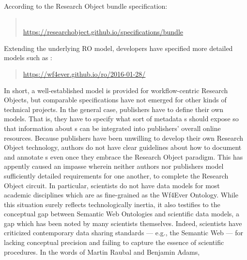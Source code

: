 \documentclass[10pt,letterpaper]{article}
\newcommand{\rpdfLink}[1]{\href{#1}{\small{#1}}}
\begin{document}
According to the Research Object bundle specification: 

\begin{quote}{}\\
\rpdfLink{https://researchobject.github.io/specifications/bundle}
\end{quote}

Extending the underlying RO model, developers have 
specified more detailed models such as :

\begin{quote}{}
\rpdfLink{https://wf4ever.github.io/ro/2016-01-28/}
\end{quote}

In short, a well-established model is provided for workflow-centric 
Research Objects, but comparable specifications have not 
emerged for other kinds of technical projects.  In the general 
case, publishers have to define their own {\RO} 
models.  That is, they have to specify what sort of 
metadata {\RO}s should expose so that 
information about {\RO}s can be integrated 
into publishers' overall online resources.  
\p{}
Because publishers have been unwilling to develop their own 
Research Object technology, authors do not have clear 
guidelines about how to document and annotate {\RO}s 
even once they embrace the Research Object paradigm.  
This has appently caused an impasse wherein 
neither authors nor publishers model sufficiently detailed 
requirements for one another, to complete the Research Object 
circuit.  In particular, scientists do not have 
{\RO} data models for most academic disciplines 
which are as fine-grained as the Wf4Ever Ontology.  
While this situation surely reflects technologically 
inertia, it also testifies to the conceptual gap between 
Semantic Web Ontologies and scientific data models, a gap 
which has been noted by many scientists themselves.  
\p{}
Indeed, scientists have criticized contemporary data sharing standards  
--- e.g., the Semantic Web --- for lacking conceptual precision 
and failing to capture the essence of scientific 
procedures.  In the words of 
Martin Raubal and Benjamin Adams,
\end{document}
